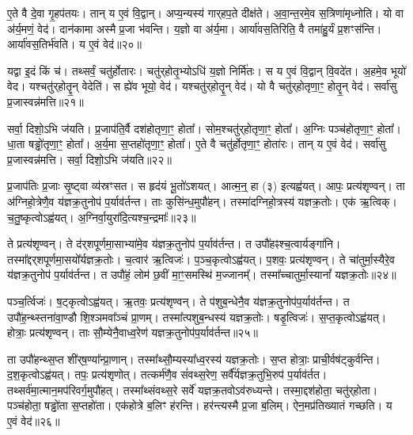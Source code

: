 ए॒ते वै दे॒वा गृ॒हप॑तयः।
तान् य ए॒वं वि॒द्वान्।
अप्य॒न्यस्य॑ गार्‌\mbox{}हप॒ते दीक्ष॑ते।
अ॒वा॒न्त॒रमे॒व स॒त्रिणा॑मृध्नोति।
यो वा अ॑र्य॒मणं॒ वेद॑।
दान॑कामा अस्मै प्र॒जा भ॑वन्ति।
य॒ज्ञो वा अ॑र्य॒मा।
आर्या॑वस॒तिरिति॒ वै तमा॑हु॒र्यं प्र॒शꣳस॑न्ति।
आर्या॑वस॒तिर्भ॑वति।
य ए॒वं वेद॑॥२०॥\ip

यद्वा इ॒दं किं च॑।
तथ्सर्वं॒ चतु॑र्\mbox{}होतारः।
चतु॑र्‌\mbox{}होतृ॒भ्योऽधि॑ य॒ज्ञो निर्मि॑तः।
स य ए॒वं वि॒द्वान्‌ वि॒वदे॑त।
अ॒हमे॒व भूयो॑ वेद।
यश्चतु॑र्‌\mbox{}होतॄ॒न् वेदेति॑।
स ह्ये॑व भूयो॒ वेद॑।
यश्चतु॑र्‌\mbox{}होतॄ॒न् वेद॑।
यो वै चतु॑र्‌\mbox{}होतृणा॒ꣳ॒ होतॄ॒न् वेद॑।
सर्वा॑सु प्र॒जास्वन्न॑मत्ति॥२१॥\ip

सर्वा॒ दिशो॒ऽभि ज॑यति।
प्र॒जा\-प॑ति॒र्वै दश॑होतृणा॒ꣳ॒ होता᳚।
सोम॒श्चतु॑र्‌\mbox{}होतृणा॒ꣳ॒ होता᳚।
अ॒ग्निः पञ्च॑होतृणा॒ꣳ॒ होता᳚।
धा॒ता षड्ढो॑तृणा॒ꣳ॒ होता᳚।
अ॒र्य॒मा स॒प्तहो॑तृणा॒ꣳ॒ होता᳚।
ए॒ते वै चतु॑र्\mbox{}होतृणा॒ꣳ॒ होता॑रः।
तान् य ए॒वं वेद॑।
सर्वा॑सु प्र॒जास्वन्न॑मत्ति।
सर्वा॒ दिशो॒ऽभि ज॑यति॥२२॥\ip\anuvakamend[आ॒र्ध्नु॒व॒न्ना॒र्ध्नु॒व॒न्नित्ये॒वं वेदा᳚त्ति सर्वा॒ दिशो॒ऽभि ज॑यति (वै तेन॑ स॒त्रङ्केन॑॥)]

प्र॒जा\-प॑तिः प्र॒जाः सृ॒ष्ट्वा व्य॑स्रꣳसत।
स हृद॑यं भू॒तो॑\-ऽशयत्।
आत्म॒न्॒ हा (३) इत्यह्व॑यत्।
आपः॒ प्रत्य॑शृण्वन्।
ता अ॑ग्निहो॒त्रेणै॒व य॑ज्ञक्र॒तुनोप॑ प॒र्याव॑र्तन्त।
ताः कुसि॑न्ध॒मुपौ॑हन्।
तस्मा॑दग्निहो॒त्रस्य॑ यज्ञक्र॒तोः।
एक॑ ऋ॒त्विक्।
च॒तु॒ष्कृत्वो\-ऽह्व॑यत्।
अ॒ग्निर्वा॒युरा॑दि॒त्यश्च॒न्द्रमाः᳚॥२३॥\ip

ते प्रत्य॑शृण्वन्।
ते द॑र्‌\mbox{}शपूर्णमा॒साभ्या॑मे॒व य॑ज्ञक्र॒तुनोप॑ प॒र्या\-व॑र्तन्त।
त उपौ॑हꣴश्च॒त्वार्यङ्गा॑नि।
तस्मा᳚द्दर्‌\mbox{}शपूर्ण\-मा॒सयो᳚र्यज्ञक्र॒तोः।
च॒त्वार॑ ऋ॒त्विजः॑।
प॒ञ्च॒कृत्वो\-ऽह्व॑यत्।
प॒शवः॒ प्रत्य॑\-शृण्वन्।
ते चा॑तुर्मा॒स्यैरे॒व य॑ज्ञक्र॒तुनोप॑ प॒र्याव॑र्तन्त।
त उपौ॑हं॒ लोम॑ छ॒वीं मा॒ꣳ॒समस्थि॑ म॒ज्जानम्᳚।
तस्मा᳚च्चातुर्मा॒स्यानां᳚ यज्ञक्र॒तोः॥२४॥\ip

पञ्च॒र्त्विजः॑।
ष॒ट्कृत्वो\-ऽह्व॑यत्।
ऋ॒तवः॒ प्रत्य॑शृण्वन्।
ते प॑शुब॒न्धेनै॒व य॑ज्ञक्र॒तुनोप॑प॒र्याव॑र्तन्त।
त उपौ॑ह॒न्थ्स्तना॑वा॒ण्डौ शि॒श्ञमवा᳚ञ्चं प्रा॒णम्।
तस्मा᳚त्पशुब॒न्धस्य॑ यज्ञक्र॒तोः।
षडृ॒त्विजः॑।
स॒प्त॒कृत्वो\-ऽह्व॑यत्।
होत्राः॒ प्रत्य॑शृण्वन्।
ताः सौ॒म्येनै॒वाध्व॒रेण॑ यज्ञक्र॒तुनोप॑प॒र्याव॑र्तन्त॥२५॥\ip

ता उपौ॑हन्थ्स॒प्त शी॑र्‌\mbox{}ष॒ण्या᳚न्प्रा॒णान्।
तस्मा᳚थ्सौ॒म्यस्या᳚ध्व॒रस्य॑ यज्ञक्र॒तोः।
स॒प्त होत्राः॒ प्राची॒र्वष॑ट्कुर्वन्ति।
द॒श॒कृत्वो\-ऽह्व॑यत्।
तपः॒ प्रत्य॑शृणोत्।
तत्कर्म॑णै॒व सं॑वथ्स॒रेण॒ सर्वै᳚र्यज्ञक्र॒तुभि॒रुप॑ प॒र्याव॑र्तत।
तथ्सर्व॑मा॒त्मान॒मप॑रिवर्ग॒मुपौ॑हत्।
तस्मा᳚थ्संवथ्स॒रे सर्वे॑ यज्ञक्र॒तवो\-ऽव॑रुध्यन्ते।
तस्मा॒द्दश॑होता॒ चतु॑र्‌\mbox{}होता।
पञ्च॑होता॒ षड्ढो॑ता स॒प्तहो॑ता।
एक॑होत्रे ब॒लिꣳ ह॑रन्ति।
हर॑न्त्यस्मै प्र॒जा ब॒लिम्।
ऐन॒मप्र॑तिख्यातं गच्छति।
य ए॒वं वेद॑॥२६॥\ip\anuvakamend[च॒न्द्रमा᳚श्चातुर्मा॒स्यानां᳚ यज्ञक्र॒तोर॑ध्व॒रेण॑ यज्ञक्र॒तुनोप॑ प॒र्याव॑र्तन्त स॒प्तहो॑ता च॒त्वारि॑ च]

